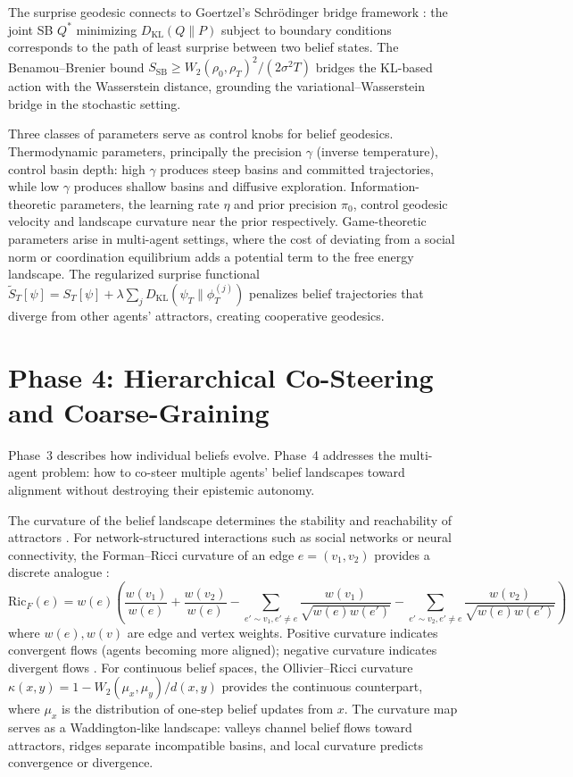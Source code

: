 \documentclass[11pt,a4paper]{article}
\theoremstyle{definition}
\newcommand{\Wass}{W_2}
\newcommand{\dkl}{D_{\mathrm{KL}}}
\begin{document}
The surprise geodesic connects to Goertzel's Schr\"{o}dinger bridge framework \citep{goertzel2025judging}: the joint SB $Q^*$ minimizing $\dkl(Q \| P)$ subject to boundary conditions corresponds to the path of least surprise between two belief states. The Benamou--Brenier bound $S_{\mathrm{SB}} \geq \Wass(\rho_0, \rho_T)^2 / (2\sigma^2 T)$ bridges the KL-based action with the Wasserstein distance, grounding the variational--Wasserstein bridge in the stochastic setting.

Three classes of parameters serve as control knobs for belief geodesics. Thermodynamic parameters, principally the precision $\gamma$ (inverse temperature), control basin depth: high $\gamma$ produces steep basins and committed trajectories, while low $\gamma$ produces shallow basins and diffusive exploration. Information-theoretic parameters, the learning rate $\eta$ and prior precision $\pi_0$, control geodesic velocity and landscape curvature near the prior respectively. Game-theoretic parameters arise in multi-agent settings, where the cost of deviating from a social norm or coordination equilibrium adds a potential term to the free energy landscape. The regularized surprise functional $\tilde{S}_T[\psi] = S_T[\psi] + \lambda \sum_j \dkl(\psi_T \| \phi^{(j)}_T)$ penalizes belief trajectories that diverge from other agents' attractors, creating cooperative geodesics.


\section{Phase 4: Hierarchical Co-Steering and Coarse-Graining}
\label{sec:phase4}

Phase~3 describes how individual beliefs evolve. Phase~4 addresses the multi-agent problem: how to co-steer multiple agents' belief landscapes toward alignment without destroying their epistemic autonomy.

The curvature of the belief landscape determines the stability and reachability of attractors \citep{hinrichs2025a, hinrichs2025b}. For network-structured interactions such as social networks or neural connectivity, the Forman--Ricci curvature of an edge $e = (v_1, v_2)$ provides a discrete analogue \citep{forman2003bochner, sreejith2016forman, weber2017}:
\begin{equation}
  \mathrm{Ric}_F(e) = w(e) \left(
    \frac{w(v_1)}{w(e)} + \frac{w(v_2)}{w(e)}
    - \sum_{e' \sim v_1, e' \neq e} \frac{w(v_1)}{\sqrt{w(e) w(e')}}
    - \sum_{e' \sim v_2, e' \neq e} \frac{w(v_2)}{\sqrt{w(e) w(e')}}
  \right)
  \label{eq:forman_ricci}
\end{equation}
where $w(e), w(v)$ are edge and vertex weights. Positive curvature indicates convergent flows (agents becoming more aligned); negative curvature indicates divergent flows \citep{znaidi2023}. For continuous belief spaces, the Ollivier--Ricci curvature $\kappa(x, y) = 1 - \Wass(\mu_x, \mu_y)/d(x,y)$ provides the continuous counterpart, where $\mu_x$ is the distribution of one-step belief updates from $x$. The curvature map serves as a Waddington-like landscape: valleys channel belief flows toward attractors, ridges separate incompatible basins, and local curvature predicts convergence or divergence.
\end{document}
